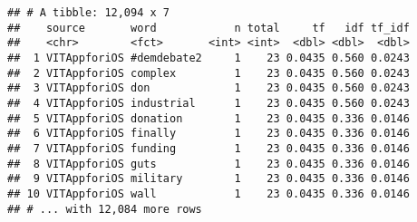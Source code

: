 \documentclass[]{article}
\newenvironment{Shaded}{\begin{snugshade}}{\end{snugshade}}
\newcommand{\DataTypeTok}[1]{\textcolor[rgb]{0.13,0.29,0.53}{#1}}
\newcommand{\DecValTok}[1]{\textcolor[rgb]{0.00,0.00,0.81}{#1}}
\newcommand{\FloatTok}[1]{\textcolor[rgb]{0.00,0.00,0.81}{#1}}
\newcommand{\KeywordTok}[1]{\textcolor[rgb]{0.13,0.29,0.53}{\textbf{#1}}}
\newcommand{\NormalTok}[1]{#1}
\newcommand{\OperatorTok}[1]{\textcolor[rgb]{0.81,0.36,0.00}{\textbf{#1}}}
\newcommand{\OtherTok}[1]{\textcolor[rgb]{0.56,0.35,0.01}{#1}}
\newcommand{\StringTok}[1]{\textcolor[rgb]{0.31,0.60,0.02}{#1}}
\begin{document}
\begin{Shaded}
\end{Shaded}

\begin{verbatim}
## # A tibble: 12,094 x 7
##    source       word            n total     tf   idf tf_idf
##    <chr>        <fct>       <int> <int>  <dbl> <dbl>  <dbl>
##  1 VITAppforiOS #demdebate2     1    23 0.0435 0.560 0.0243
##  2 VITAppforiOS complex         1    23 0.0435 0.560 0.0243
##  3 VITAppforiOS don             1    23 0.0435 0.560 0.0243
##  4 VITAppforiOS industrial      1    23 0.0435 0.560 0.0243
##  5 VITAppforiOS donation        1    23 0.0435 0.336 0.0146
##  6 VITAppforiOS finally         1    23 0.0435 0.336 0.0146
##  7 VITAppforiOS funding         1    23 0.0435 0.336 0.0146
##  8 VITAppforiOS guts            1    23 0.0435 0.336 0.0146
##  9 VITAppforiOS military        1    23 0.0435 0.336 0.0146
## 10 VITAppforiOS wall            1    23 0.0435 0.336 0.0146
## # ... with 12,084 more rows
\end{verbatim}

\begin{Shaded}
\end{Shaded}
\end{document}
